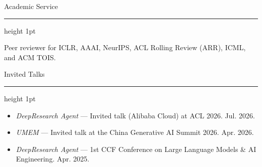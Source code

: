 \documentclass[10.5pt]{article}
\newcommand{\cvsection}[1]{%
  \vspace{10pt}
  {\color{accent}\headingfont\Large #1}\par
  \vspace{2pt}
  {\color{accent}\hrule height 1pt}
  \vspace{6pt}
}
\begin{document}
\cvsection{Academic Service}
Peer reviewer for ICLR, AAAI, NeurIPS, ACL Rolling Review (ARR), ICML, and ACM TOIS.

\cvsection{Invited Talks}
\begin{itemize}
  \item \textit{DeepResearch Agent} --- Invited talk (Alibaba Cloud) at ACL 2026. Jul. 2026.
  \item \textit{UMEM} --- Invited talk at the China Generative AI Summit 2026. Apr. 2026.
  \item \textit{DeepResearch Agent} --- 1st CCF Conference on Large Language Models \& AI Engineering. Apr. 2025.
\end{itemize}
\end{document}
